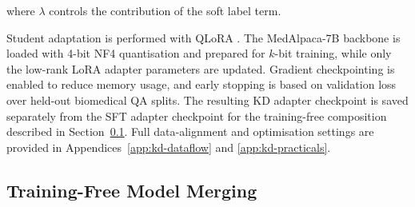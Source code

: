 \documentclass[conference]{IEEEtran}
\begin{document}
where $\lambda$ controls the contribution of the soft label term.

Student adaptation is performed with QLoRA \cite{dettmers2023qlora}. The MedAlpaca-7B backbone is loaded with 4-bit NF4 quantisation and prepared for $k$-bit training, while only the low-rank LoRA adapter parameters are updated. Gradient checkpointing is enabled to reduce memory usage, and early stopping is based on validation loss over held-out biomedical QA splits. The resulting KD adapter checkpoint is saved separately from the SFT adapter checkpoint for the training-free composition described in Section~\ref{sec:merge}. Full data-alignment and optimisation settings are provided in Appendices~\ref{app:kd-dataflow} and \ref{app:kd-practicals}.

\subsection{Training-Free Model Merging}
\label{sec:merge}


\end{document}

